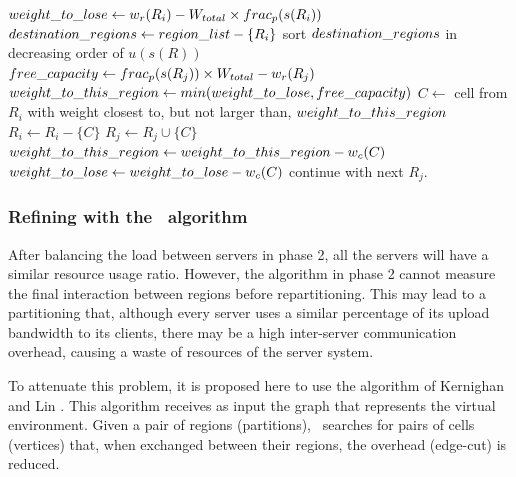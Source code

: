 \begin{algorithm}
\caption{\bfa}
\label{alg:bfa}
\begin{algorithmic}[1]

			\STATE $weight\_to\_lose \leftarrow w_r(R_i) - W_{total} \times frac_p(s(R_i))$ \label{alg:bfa:wlose}
			\STATE $destination\_regions \leftarrow region\_list - \{R_i\}$
			\STATE sort $destination\_regions$ in decreasing order of $u(s(R))$ \label{alg:bfa:sort}
				 \STATE $free\_capacity \leftarrow frac_p(s(R_j)) \times W_{total} - w_r(R_j)$ \label{alg:bfa:freecap}
				 \STATE $weight\_to\_this\_region \leftarrow min(weight\_to\_lose, free\_capacity)$ \label{alg:bfa:min}
				 			 \STATE $C \leftarrow$ cell from $R_i$ with weight closest to, but not larger than, $weight\_to\_this\_region$ \label{alg:bfa:bestfit}
				 			 \STATE $R_i \leftarrow R_i - \{C\}$
				 			 \STATE $R_j \leftarrow R_j \cup \{C\}$
				 			 \STATE $weight\_to\_this\_region \leftarrow weight\_to\_this\_region - w_c(C)$
				 			 \STATE $weight\_to\_lose \leftarrow weight\_to\_lose - w_c(C)$
				 		\ELSE
				 			 \STATE continue with next $R_j$. \label{alg:bfa:continue}
				 		\ENDIF
				 \ENDWHILE
			\ENDFOR			
	 \ENDFOR

\end{algorithmic}
\end{algorithm}


\subsubsection{Refining with the \kl\ algorithm}
\label{sec:alg:kl}
	
After balancing the load between servers in phase 2, all the servers will have a similar resource usage ratio. However, the algorithm in phase 2 cannot measure the final interaction between regions before repartitioning. This may lead to a partitioning that, although every server uses a similar percentage of its upload bandwidth to its clients, there may be a high inter-server communication overhead, causing a waste of resources of the server system.

To attenuate this problem, it is proposed here to use the algorithm of Kernighan and Lin \cite{kernighan1970ehp}. This algorithm receives as input the graph that represents the virtual environment. Given a pair of regions (partitions), \kl\ searches for pairs of cells (vertices) that, when exchanged between their regions, the overhead (edge-cut) is reduced.


